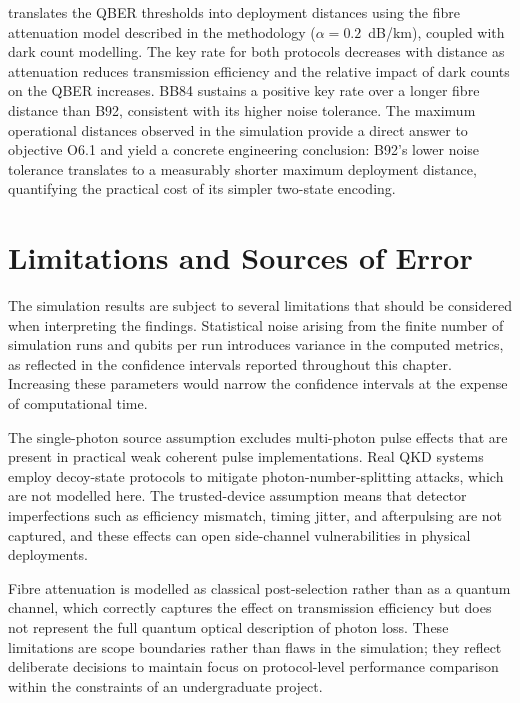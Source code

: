 \documentclass[10pt, a4paper]{report}
\begin{document}
 translates the QBER thresholds into deployment distances using the fibre attenuation model described in the methodology ($\alpha = 0.2$~dB/km), coupled with dark count modelling. The key rate for both protocols decreases with distance as attenuation reduces transmission efficiency and the relative impact of dark counts on the QBER increases. BB84 sustains a positive key rate over a longer fibre distance than B92, consistent with its higher noise tolerance. The maximum operational distances observed in the simulation provide a direct answer to objective O6.1 and yield a concrete engineering conclusion: B92's lower noise tolerance translates to a measurably shorter maximum deployment distance, quantifying the practical cost of its simpler two-state encoding.




\section{Limitations and Sources of Error}
\label{sec:limitations-results}

The simulation results are subject to several limitations that should be considered when interpreting the findings. Statistical noise arising from the finite number of simulation runs and qubits per run introduces variance in the computed metrics, as reflected in the confidence intervals reported throughout this chapter. Increasing these parameters would narrow the confidence intervals at the expense of computational time.

The single-photon source assumption excludes multi-photon pulse effects that are present in practical weak coherent pulse implementations. Real QKD systems employ decoy-state protocols to mitigate photon-number-splitting attacks, which are not modelled here. The trusted-device assumption means that detector imperfections such as efficiency mismatch, timing jitter, and afterpulsing are not captured, and these effects can open side-channel vulnerabilities in physical deployments.

Fibre attenuation is modelled as classical post-selection rather than as a quantum channel, which correctly captures the effect on transmission efficiency but does not represent the full quantum optical description of photon loss. These limitations are scope boundaries rather than flaws in the simulation; they reflect deliberate decisions to maintain focus on protocol-level performance comparison within the constraints of an undergraduate project.
\end{document}
